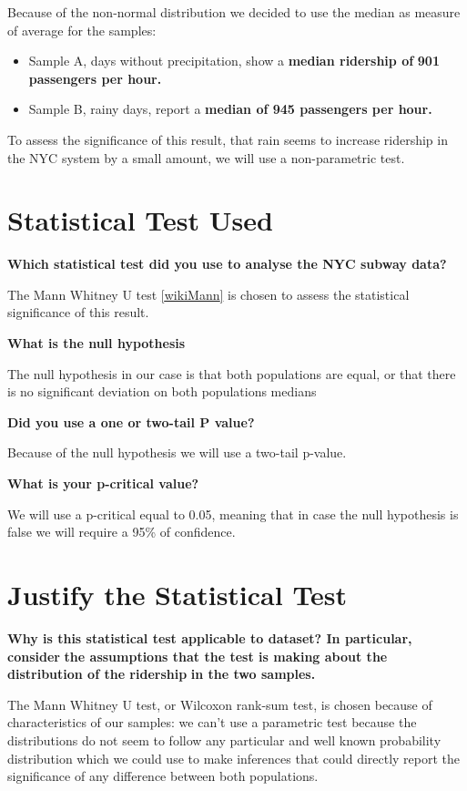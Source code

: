 \documentclass[a4paper,12pt,english]{sphinxmanual}
\begin{document}
Because of the non-normal distribution we decided to use the median as measure
of average for the samples:
\begin{itemize}
\item {} 
Sample A, days without precipitation, show a \textbf{median ridership of}
\textbf{901 passengers per hour.}

\item {} 
Sample B, rainy days, report a \textbf{median of 945 passengers per hour.}

\end{itemize}

To assess the significance of this result, that rain seems to increase ridership
in the NYC system by a small amount, we will use a non-parametric test.


\section{Statistical Test Used}
\label{section1:statistical-test-used}
\textbf{Which statistical test did you use to analyse the NYC subway data?}

The Mann Whitney U test {\hyperref[overview:wikimann]{{[}wikiMann{]}}} is chosen to assess the statistical
significance of this result.

\textbf{What is the null hypothesis}

The null hypothesis in our case is that both populations are equal, or that
there is no significant deviation on both
populations medians

\textbf{Did you use a one or two-tail P value?}

Because of the null hypothesis we will use a two-tail p-value.

\textbf{What is your p-critical value?}

We will use a p-critical equal to 0.05, meaning that in case the null hypothesis
is false we will require a 95\% of confidence.


\section{Justify the Statistical Test}
\label{section1:justify-the-statistical-test}
\textbf{Why is this statistical test applicable to dataset? In particular, consider}
\textbf{the assumptions that the test is making about the distribution of the ridership}
\textbf{in the two samples.}

The Mann Whitney U test, or Wilcoxon rank-sum test, is chosen because of
characteristics of our samples: we can't use a parametric test because the
distributions do not seem to follow any particular and well known probability
distribution which we could use to make inferences that could directly report
the significance of any difference between both populations.
\end{document}
